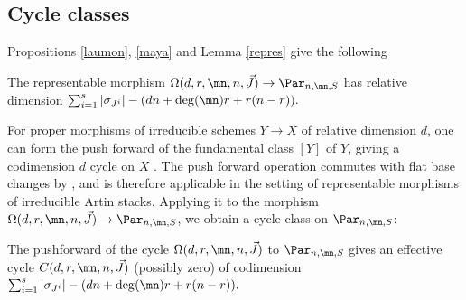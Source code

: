 \subsection{Cycle classes}
Propositions \ref{laumon}, \ref{maya} and Lemma \ref{repres} give the following
\begin{corollary}
\notready
The representable morphism $\Omega(d,r,\mn,n,\vec{J})\to \Par_{n,\mn,S}$ has relative dimension
$\sum_{i=1}^s |\sigma_{J^i}| -(dn +\deg(\mn)r +r(n-r)).$
\end{corollary}
For proper morphisms of irreducible schemes $Y\to X$ of relative dimension $d$, one can form the push forward of the fundamental class $[Y]$  of $Y$, giving  a codimension $d$ cycle on $X$ \cite[Section 1.4]{FInt}. The push forward operation commutes with flat base changes by \cite[Proposition 1.7]{FInt}, and is therefore applicable in the setting of representable morphisms of irreducible Artin stacks. Applying it to the morphism $\Omega(d,r,\mn,n,\vec{J})\to \Par_{n,\mn,S}$, we obtain a cycle class on $\Par_{n,\mn,S}$:
\begin{defi}
\notready\label{cyclist}
The pushforward of the cycle $\Omega(d,r,\mn,n,\vec{J})$ to $\Par_{n,\mn,S}$ gives an effective cycle $C(d,r,\mn,n,\vec{J})$ (possibly zero) of codimension
 $\sum_{i=1}^s |\sigma_{J^i}| -(dn +\deg(\mn)r +r(n-r)).$
 \end{defi}
